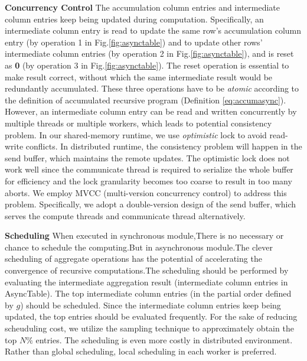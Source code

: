 \noindent\textbf{Concurrency Control}
The accumulation column entries and intermediate column entries keep being updated during computation. Specifically, an intermediate column entry is read to update the same row's accumulation column entry (by operation 1 in Fig.\ref{fig:asynctable}) and to update other rows' intermediate column entries (by operation 2 in Fig.\ref{fig:asynctable}), and is reset as \textbf{0} (by operation 3 in Fig.\ref{fig:asynctable}). The reset operation is essential to make result correct, without which the same intermediate result would be redundantly accumulated. These three operations have to be \emph{atomic} according to the definition of accumulated recursive program (Definition \ref{eq:accumasync}). However, an intermediate column entry can be read and written concurrently by multiple threads or multiple workers, which leads to potential consistency problem. In our shared-memory runtime, we use \emph{optimistic} lock to avoid read-write conflicts. In distributed runtime, the consistency problem will happen in the send buffer, which maintains the remote updates. The optimistic lock does not work well since the communicate thread is required to serialize the whole buffer for efficiency and the lock granularity becomes too coarse to result in too many aborts. We employ MVCC (multi-version concurrency control) to address this problem. Specifically, we adopt a double-version design of the send buffer, which serves the compute threads and communicate thread alternatively.


\noindent\textbf{Scheduling}
When executed in synchronous module,There is no necessary or chance to schedule the computing.But in asynchronous module.The clever scheduling of aggregate operations has the potential of accelerating the convergence of recursive computations.The scheduling should be performed by evaluating the intermediate aggregation result (intermediate column entries in AsyncTable). The top intermediate column entries (in the partial order defined by $g$) should be scheduled. Since the intermediate column entries keep being updated, the top entries should be evaluated frequently. For the sake of reducing scheuduling cost, we utilize the sampling technique \cite{Zhang:2011:PDF:2038916.2038929} to approximately obtain the top $N\%$ entries. The scheduling is even more costly in distributed environment. Rather than global scheduling, local scheduling in each worker is preferred.

